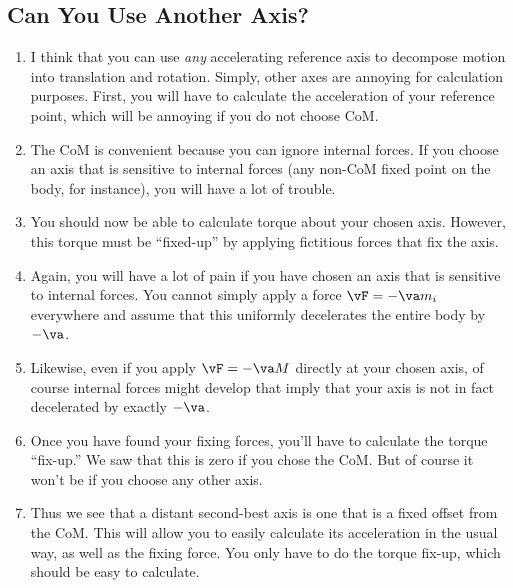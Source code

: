 \subsection{Can You Use Another Axis?}

\begin{enumerate}
  \item I think that you can use \emph{any} accelerating reference axis
  to decompose motion into translation and rotation. Simply, other axes
  are annoying for calculation purposes. First, you will have to
  calculate the acceleration of your reference point, which will be
  annoying if you do not choose CoM.

  \item The CoM is convenient because you can ignore internal forces. If
  you choose an axis that is sensitive to internal forces (any non-CoM
  fixed point on the body, for instance), you will have a lot of
  trouble.

  \item You should now be able to calculate torque about your chosen
  axis. However, this torque must be ``fixed-up'' by applying
  fictitious forces that fix the axis.

  \item Again, you will have a lot of pain if you have chosen an axis
  that is sensitive to internal forces. You cannot simply apply a force
  $\vF = -\va m_i$ everywhere and assume that this uniformly decelerates
  the entire body by $-\va$.

  \item Likewise, even if you apply $\vF = -\va M$ directly at your
  chosen axis, of course internal forces might develop that imply that
  your axis is not in fact decelerated by exactly $-\va$.

  \item Once you have found your fixing forces, you'll have to calculate
  the torque ``fix-up.'' We saw that this is zero if you chose the CoM.
  But of course it won't be if you choose any other axis.

  \item Thus we see that a distant second-best axis is one that is a
  fixed offset from the CoM. This will allow you to easily calculate its
  acceleration in the usual way, as well as the fixing force. You only
  have to do the torque fix-up, which should be easy to calculate.
\end{enumerate}
